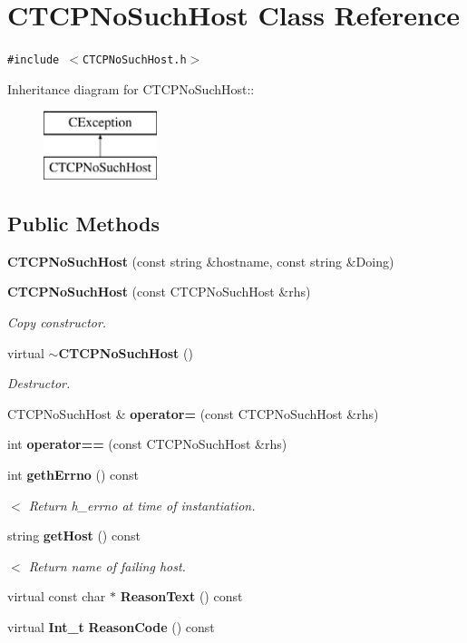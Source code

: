 \section{CTCPNo\-Such\-Host  Class Reference}
\label{classCTCPNoSuchHost}
{\tt \#include $<$CTCPNo\-Such\-Host.h$>$}

Inheritance diagram for CTCPNo\-Such\-Host::\begin{figure}[H]
\begin{center}
\leavevmode
\includegraphics[height=2cm]{classCTCPNoSuchHost}
\end{center}
\end{figure}
\subsection*{Public Methods}
\begin{CompactItemize}
\item 
{\bf CTCPNo\-Such\-Host} (const string \&hostname, const string \&Doing)
\item 
{\bf CTCPNo\-Such\-Host} (const CTCPNo\-Such\-Host \&rhs)
\begin{CompactList}\small\item\em Copy constructor.\item\end{CompactList}\item 
virtual {\bf $\sim$CTCPNo\-Such\-Host} ()
\begin{CompactList}\small\item\em Destructor.\item\end{CompactList}\item 
CTCPNo\-Such\-Host \& {\bf operator=} (const CTCPNo\-Such\-Host \&rhs)
\item 
int {\bf operator==} (const CTCPNo\-Such\-Host \&rhs)
\item 
int {\bf geth\-Errno} () const
\begin{CompactList}\small\item\em $<$ Return h\_\-errno at time of instantiation.\item\end{CompactList}\item 
string {\bf get\-Host} () const
\begin{CompactList}\small\item\em $<$ Return name of failing host.\item\end{CompactList}\item 
virtual const char $\ast$ {\bf Reason\-Text} () const
\item 
virtual {\bf Int\_\-t} {\bf Reason\-Code} () const
\end{CompactItemize}
